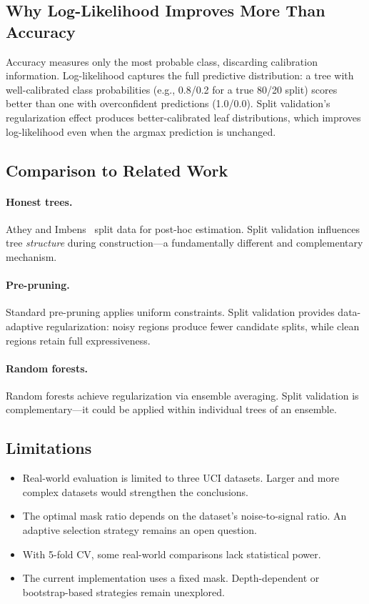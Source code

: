 \documentclass[11pt,a4paper]{article}
\begin{document}
\subsection{Why Log-Likelihood Improves More Than Accuracy}

Accuracy measures only the most probable class, discarding calibration
information. Log-likelihood captures the full predictive distribution: a tree
with well-calibrated class probabilities (e.g., 0.8/0.2 for a true 80/20 split)
scores better than one with overconfident predictions (1.0/0.0). Split
validation's regularization effect produces better-calibrated leaf distributions,
which improves log-likelihood even when the argmax prediction is unchanged.

\subsection{Comparison to Related Work}

\paragraph{Honest trees.}
Athey and Imbens~\cite{athey2016} split data for post-hoc estimation.
Split validation influences tree \emph{structure} during construction---a
fundamentally different and complementary mechanism.

\paragraph{Pre-pruning.}
Standard pre-pruning applies uniform constraints. Split validation provides
data-adaptive regularization: noisy regions produce fewer candidate splits,
while clean regions retain full expressiveness.

\paragraph{Random forests.}
Random forests achieve regularization via ensemble averaging. Split validation
is complementary---it could be applied within individual trees of an ensemble.

\subsection{Limitations}

\begin{itemize}
    \item Real-world evaluation is limited to three UCI datasets. Larger and
          more complex datasets would strengthen the conclusions.
    \item The optimal mask ratio depends on the dataset's noise-to-signal
          ratio. An adaptive selection strategy remains an open question.
    \item With 5-fold CV, some real-world comparisons lack statistical power.
    \item The current implementation uses a fixed mask. Depth-dependent or
          bootstrap-based strategies remain unexplored.
\end{itemize}
\end{document}
